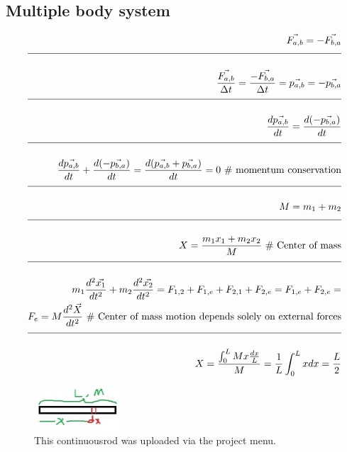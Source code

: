 \documentclass[a4paper]{article}
\newcommand{\eqComment}[1]{\text{  \# #1}}
\newcommand{\n}{\\[1.5ex] \hline \nonumber \\[0ex]}
\newcommand{\m}{\nonumber \\}
\begin{document}
\subsection{Multiple body system}
\begin{tcolorbox}
\begin{align}
   \vec{F_{a, b}} = -\vec{F_{b, a}} 
\n \frac{\vec{F_{a, b}}}{\Delta t} = \frac{-\vec{F_{b, a}}}{\Delta t} = \vec{p_{a, b}} = -\vec{p_{b, a}}
\n \frac{d\vec{p_{a, b}}}{dt} = \frac{d(-\vec{p_{b, a}})}{dt}
\n \frac{d\vec{p_{a, b}}}{dt} + \frac{d(-\vec{p_{b, a}})}{dt} = \frac{d(\vec{p_{a, b}} + \vec{p_{b, a}})}{dt} = 0 \eqComment{momentum conservation}
\n M = m_1 + m_2
\n X = \frac{m_1 x_1 + m_2 x_2}{M} \eqComment{Center of mass}
\n m_1 \frac{d^2 \vec{x_1}}{dt^2} + m_2 \frac{d^2 \vec{x_2}}{dt^2} = F_{1,2} + F_{1,e} + F_{2,1} + F_{2,e} = F_{1,e} + F_{2,e} = 
\m F_e = M \frac{d^2 \vec{X}}{dt^2} \eqComment{Center of mass motion depends solely on external forces}
\n X = \frac{\int_0^L M x \frac{dx}{L}}{M} = \frac{1}{L} \int_0^L x dx = \frac{L}{2}
\end{align}
\end{tcolorbox}

\begin{figure}[h]
\centering
\includegraphics[width=0.3\textwidth]{figures/continuousrod.jpg}
\caption{\label{fig:continuousrod}This continuousrod was uploaded via the project menu.}
\end{figure} \FloatBarrier
\end{document}
